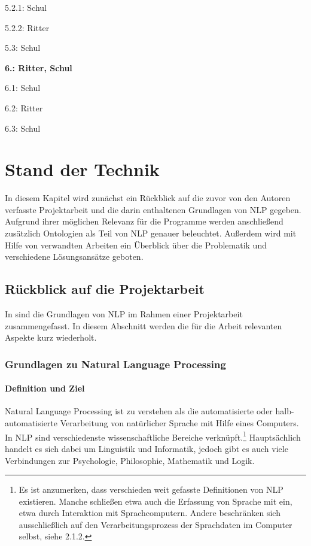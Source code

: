 \documentclass[12pt]{report}
\begin{document}
\begin{center}
\begin{multicols}{2}
\begin{compactitem}
\begin{compactitem}
\begin{compactitem}
\item[] 5.2.1: Schul
\item[] 5.2.2: Ritter
\end{compactitem}
\item[] 5.3: Schul
\end{compactitem}
\item[] \textbf{6.: Ritter, Schul}
\begin{compactitem}
\item[] 6.1: Schul
\item[] 6.2: Ritter
\item[] 6.3: Schul
\end{compactitem}
\end{compactitem}
\end{multicols}
\end{center}

\chapter{Stand der Technik}
In diesem Kapitel wird zunächst ein Rückblick auf die zuvor von den Autoren verfasste Projektarbeit und die darin enthaltenen Grundlagen von NLP gegeben. 
Aufgrund ihrer möglichen Relevanz für die Programme werden anschließend zusätzlich Ontologien als Teil von NLP genauer beleuchtet. 
Außerdem wird mit Hilfe von verwandten Arbeiten ein Überblick über die Problematik und verschiedene Lösungsansätze geboten. 

\section[Rückblick auf die PA]{Rückblick auf die Projektarbeit}
In \cite{rs18} sind die Grundlagen von NLP im Rahmen einer Projektarbeit zusammengefasst. In diesem Abschnitt werden die für die Arbeit relevanten Aspekte kurz wiederholt. 
\subsection{Grundlagen zu Natural Language Processing}
\subsubsection{Definition und Ziel}
Natural Language Processing ist zu verstehen als die automatisierte oder halb-automatisierte Verarbeitung von natürlicher Sprache mit Hilfe eines Computers. In NLP sind verschiedenste wissenschaftliche Bereiche verknüpft.\footnote{Es ist anzumerken, dass verschieden weit gefasste Definitionen von NLP existieren. Manche schließen etwa auch die Erfassung von Sprache mit ein, etwa durch Interaktion mit Sprachcomputern. Andere beschränken sich ausschließlich auf den Verarbeitungsprozess der Sprachdaten im Computer selbst, siehe 2.1.2.} Hauptsächlich handelt es sich dabei um Linguistik und Informatik, jedoch gibt es auch viele Verbindungen zur Psychologie, Philosophie, Mathematik und Logik. \cite{cop04}
\end{document}
